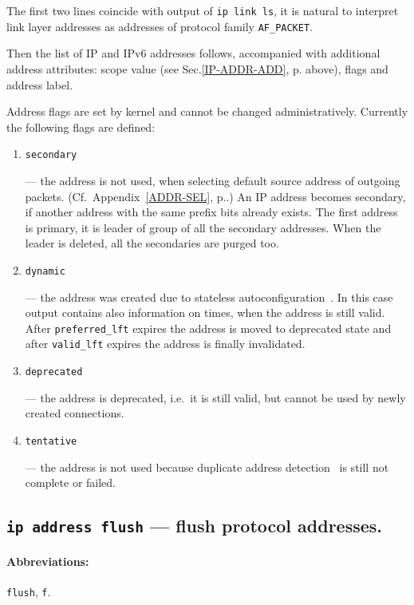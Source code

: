 The first two lines coincide with output of \verb|ip link ls|,
it is natural to interpret link layer addresses
as addresses of protocol family \verb|AF_PACKET|.

Then the list of IP and IPv6 addresses follows, accompanied with
additional address attributes: scope value (see Sec.\ref{IP-ADDR-ADD},
p.\pageref{IP-ADDR-ADD} above), flags and address label.

Address flags are set by kernel and cannot be changed
administratively. Currently the following flags are defined:

\begin{enumerate}
\item \verb|secondary|

--- the address is not used, when selecting default source address
of outgoing packets. (Cf.\ Appendix~\ref{ADDR-SEL}, p.\pageref{ADDR-SEL}.)
An IP address becomes secondary, if another address with the same
prefix bits already exists. The first address is primary,
it is leader of group of all the secondary addresses. When the leader
is deleted, all the secondaries are purged too.


\item \verb|dynamic|

--- the address was created due to stateless autoconfiguration~\cite{RFC-ADDRCONF}.
In this case output contains also information on times, when
the address is still valid. After \verb|preferred_lft| expires the address is
moved to deprecated state and after \verb|valid_lft| expires the address
is finally invalidated.

\item \verb|deprecated|

--- the address is deprecated, i.e.\ it is still valid, but cannot
be used by newly created connections.

\item \verb|tentative|

--- the address is not used because duplicate address detection~\cite{RFC-ADDRCONF}
is still not complete or failed.

\end{enumerate}


\subsection{{\tt ip address flush} --- flush protocol addresses.}
\label{IP-ADDR-FLUSH}

\paragraph{Abbreviations:} \verb|flush|, \verb|f|.

